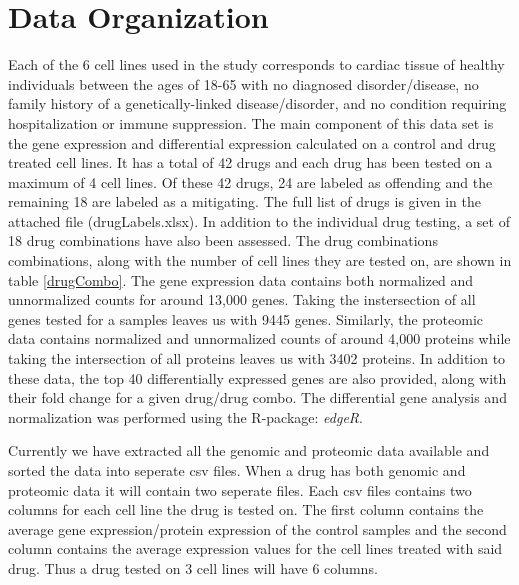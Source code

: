 \documentclass[]{article}
\begin{document}
\section{Data Organization}

Each of the 6 cell lines used in the study corresponds to cardiac tissue of healthy individuals between the ages of 18-65 with no diagnosed disorder/disease, no family  history of a genetically-linked disease/disorder, and no condition requiring hospitalization or immune suppression.
The main component of this data set is the gene expression and differential expression calculated on a control and drug treated cell lines. It has a total of 42 drugs and each drug has been tested on a maximum of 4 cell lines. 
Of these 42 drugs, 24 are labeled as offending and the remaining 18 are labeled as a mitigating. The full list of drugs is given in the attached file (drugLabels.xlsx).
In addition to the individual drug testing, a set of 18 drug combinations have also been assessed. The drug combinations combinations, along with the number of cell lines they are tested on, are shown in table \ref{drugCombo}. 
The gene expression data contains both normalized and unnormalized counts for around 13,000 genes. Taking the instersection of all genes tested for a samples leaves us with 9445 genes. Similarly, the proteomic data contains normalized and unnormalized counts of around 4,000 proteins while taking the intersection of all proteins leaves us with 3402 proteins. 
In addition to these data, the top 40 differentially expressed genes are also provided, along with their fold change for a given drug/drug combo. The differential gene analysis and normalization was performed using the R-package: \emph{edgeR}.

Currently we have extracted all the genomic and proteomic data available and sorted the data into seperate csv files. When a drug has both genomic and proteomic data it will contain two seperate files. 
Each csv files contains two columns for each cell line the drug is tested on. 
The first column contains the average gene expression/protein expression of the control samples and the second column contains the average expression values for the cell lines treated with said drug. Thus a drug tested on 3 cell lines will have 6 columns.
\end{document}
